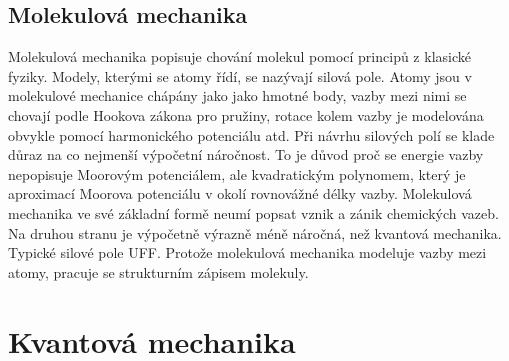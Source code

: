 \documentclass[
  color, %
  table, %
  lof,   %
  lot,   %
]{fithesis3}
\begin{document}


%

\subsection{Molekulová mechanika}

Molekulová mechanika popisuje chování molekul pomocí principů z klasické fyziky. Modely, kterými se atomy řídí, se nazývají silová pole. Atomy jsou v molekulové mechanice chápány jako jako hmotné body, vazby mezi nimi se chovají podle Hookova zákona pro pružiny, rotace kolem vazby je modelována obvykle pomocí harmonického potenciálu atd. Při návrhu silových polí se klade důraz na co nejmenší výpočetní náročnost. To je důvod proč se energie vazby nepopisuje Moorovým potenciálem, ale kvadratickým polynomem, který je aproximací Moorova potenciálu v okolí rovnovážné délky vazby. Molekulová mechanika ve své základní formě neumí popsat vznik a zánik chemických vazeb. Na druhou stranu je výpočetně výrazně méně náročná, než kvantová mechanika. Typické silové pole UFF. Protože molekulová mechanika modeluje vazby mezi atomy, pracuje se strukturním zápisem molekuly.

\section{Kvantová mechanika}
\end{document}
